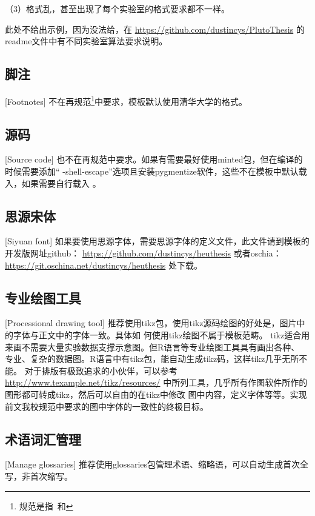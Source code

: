 （3）格式乱，甚至出现了每个实验室的格式要求都不一样。

此处不给出示例，因为没法给，在
\href{https://github.com/dustincys/PlutoThesis}{https://github.com/dustincys/PlutoThesis}
的readme文件中有不同实验室算法要求说明。

\subsection{脚注}[Footnotes]
不在再规范\footnote{规范是指\PGR\ 和\UGR}中要求，模板默认使用清华大学的格式。

\subsection{源码}[Source code]
也不在再规范中要求。如果有需要最好使用minted包，但在编译的时候需要添加“
-shell-escape”选项且安装pygmentize软件，这些不在模板中默认载入，如果需要自行载入
。
\subsection{思源宋体}[Siyuan font]
如果要使用思源字体，需要思源字体的定义文件，此文件请到模板的开发版网址github：
\href{https://github.com/dustincys/heuthesis}{https://github.com/dustincys/heuthesis}
或者oschia：
\href{https://git.oschina.net/dustincys/heuthesis}{https://git.oschina.net/dustincys/heuthesis}
处下载。

\subsection{专业绘图工具}[Processional drawing tool]
\label{drawtool}
推荐使用tikz包，使用tikz源码绘图的好处是，图片中的字体与正文中的字体一致。具体如
何使用tikz绘图不属于模板范畴。
tikz适合用来画不需要大量实验数据支撑示意图。但R语言等专业绘图工具具有画出各种、
专业、复杂的数据图。R语言中有tikz包，能自动生成tikz码，这样tikz几乎无所不能。
对于排版有极致追求的小伙伴，可以参考
\href{http://www.texample.net/tikz/resources/}{http://www.texample.net/tikz/resources/}
中所列工具，几乎所有作图软件所作的图形都可转成tikz，然后可以自由的在tikz中修改
图中内容，定义字体等等。实现前文我校规范中要求的图中字体的一致性的终极目标。


\subsection{术语词汇管理}[Manage glossaries]
推荐使用glossaries包管理术语、缩略语，可以自动生成首次全写，非首次缩写。

